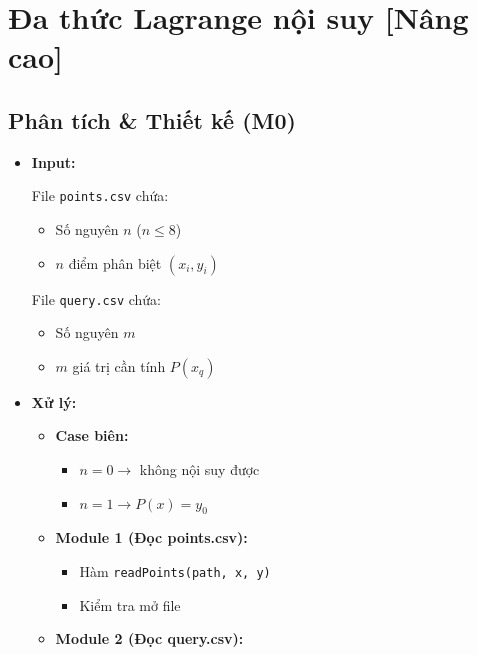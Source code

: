 \section{Đa thức Lagrange nội suy [Nâng cao]}
\subsection{Phân tích \& Thiết kế (M0)}

\begin{itemize}

    \item \textbf{Input:}

    File \texttt{points.csv} chứa:
    \begin{itemize}
        \item Số nguyên $n$ ($n \le 8$)
        \item $n$ điểm phân biệt $(x_i, y_i)$
    \end{itemize}

    File \texttt{query.csv} chứa:
    \begin{itemize}
        \item Số nguyên $m$
        \item $m$ giá trị cần tính $P(x_q)$
    \end{itemize}

    \item \textbf{Xử lý:}

    \begin{itemize}

        \item \textbf{Case biên:}

        \begin{itemize}
            \item $n = 0 \rightarrow$ không nội suy được
            \item $n = 1 \rightarrow P(x)=y_0$
        \end{itemize}

        \item \textbf{Module 1 (Đọc points.csv):}

        \begin{itemize}
            \item Hàm \texttt{readPoints(path, x, y)}
            \item Kiểm tra mở file
        \end{itemize}

        \item \textbf{Module 2 (Đọc query.csv):}


\end{itemize}
\end{itemize}
